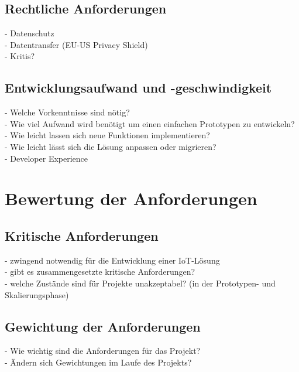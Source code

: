 \subsection{Rechtliche Anforderungen}\label{subsec:Rechtliche Anforderungen}
- Datenschutz\\
- Datentransfer (EU-US Privacy Shield)\\
- Kritis?\\
\subsection{Entwicklungsaufwand und -geschwindigkeit}\label{subsec:Entwicklungsaufwand und -geschwindigkeit}
- Welche Vorkenntnisse sind nötig?\\
- Wie viel Aufwand wird benötigt um einen einfachen Prototypen zu entwickeln?\\
- Wie leicht lassen sich neue Funktionen implementieren?\\
- Wie leicht lässt sich die Lösung anpassen oder migrieren?\\
- Developer Experience\\
\section{Bewertung der Anforderungen}\label{sec:Bewertung der Anforderungen}
\subsection{Kritische Anforderungen}\label{subsec:Kritische Anforderungen}
- zwingend notwendig für die Entwicklung einer IoT-Lösung\\
- gibt es zusammengesetzte kritische Anforderungen?\\
- welche Zustände sind für Projekte unakzeptabel? (in der Prototypen- und Skalierungsphase)\\
\subsection{Gewichtung der Anforderungen}\label{subsec:Gewichtung der Anforderungen}
- Wie wichtig sind die Anforderungen für das Projekt?\\
- Ändern sich Gewichtungen im Laufe des Projekts?\\
